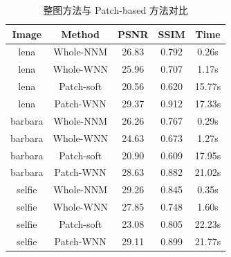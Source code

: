 \begin{table}[htbp]
\centering
\caption{整图方法与 Patch-based 方法对比}
\label{tab:chapter4_whole_patch}
\small
\begin{tabular}{|c|c|c|c|c|}
\hline
Image & Method & PSNR & SSIM & Time \\
\hline
lena & Whole-NNM & 26.83 & 0.792 & 0.26s \\
lena & Whole-WNN & 25.96 & 0.707 & 1.17s \\
lena & Patch-soft & 20.56 & 0.620 & 15.77s \\
lena & Patch-WNN & 29.37 & 0.912 & 17.33s \\
barbara & Whole-NNM & 26.26 & 0.767 & 0.29s \\
barbara & Whole-WNN & 24.63 & 0.673 & 1.27s \\
barbara & Patch-soft & 20.90 & 0.609 & 17.95s \\
barbara & Patch-WNN & 28.63 & 0.882 & 21.02s \\
selfie & Whole-NNM & 29.26 & 0.845 & 0.35s \\
selfie & Whole-WNN & 27.85 & 0.748 & 1.60s \\
selfie & Patch-soft & 23.08 & 0.805 & 22.23s \\
selfie & Patch-WNN & 29.11 & 0.899 & 21.77s \\
\hline
\end{tabular}
\end{table}
